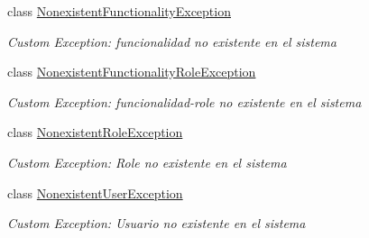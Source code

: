 \begin{DoxyCompactItemize}
class \hyperlink{class_h_k_supply_1_1_exceptions_1_1_nonexistent_functionality_exception}{Nonexistent\+Functionality\+Exception}
\begin{DoxyCompactList}\small\item\em Custom Exception\+: funcionalidad no existente en el sistema \end{DoxyCompactList}\item 
class \hyperlink{class_h_k_supply_1_1_exceptions_1_1_nonexistent_functionality_role_exception}{Nonexistent\+Functionality\+Role\+Exception}
\begin{DoxyCompactList}\small\item\em Custom Exception\+: funcionalidad-\/role no existente en el sistema \end{DoxyCompactList}\item 
class \hyperlink{class_h_k_supply_1_1_exceptions_1_1_nonexistent_role_exception}{Nonexistent\+Role\+Exception}
\begin{DoxyCompactList}\small\item\em Custom Exception\+: Role no existente en el sistema \end{DoxyCompactList}\item 
class \hyperlink{class_h_k_supply_1_1_exceptions_1_1_nonexistent_user_exception}{Nonexistent\+User\+Exception}
\begin{DoxyCompactList}\small\item\em Custom Exception\+: Usuario no existente en el sistema \end{DoxyCompactList}\end{DoxyCompactItemize}
